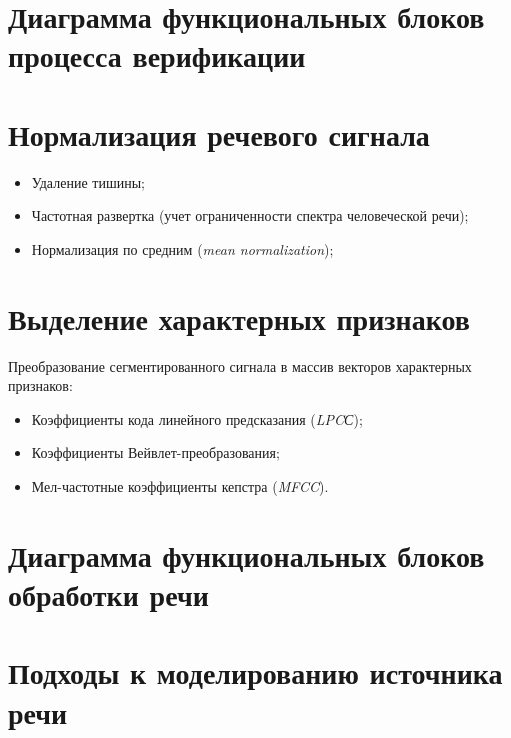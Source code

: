 \documentclass[12pt]{article}
\newcommand{\important}[1]{\emph{#1}}
\begin{document}
\section{Диаграмма функциональных блоков процесса верификации}

\begin{figure}[h!]
\end{figure}

\section{Нормализация речевого сигнала}

\begin{itemize}
    \item Удаление тишины;
    \item Частотная развертка (учет ограниченности спектра человеческой речи);
    \item Нормализация по средним (\important{mean normalization});
\end{itemize}

\section{Выделение характерных признаков}

Преобразование сегментированного сигнала в массив векторов характерных признаков:
\begin{itemize}
    \item Коэффициенты кода линейного предсказания (\important{LPCС});
    \item Коэффициенты Вейвлет-преобразования;
    \item Мел-частотные коэффициенты кепстра (\important{MFCC}).
\end{itemize}

\section{Диаграмма функциональных блоков обработки речи}

\begin{figure}[h!]
\end{figure}

\section{Подходы к моделированию источника речи}
\end{document}
